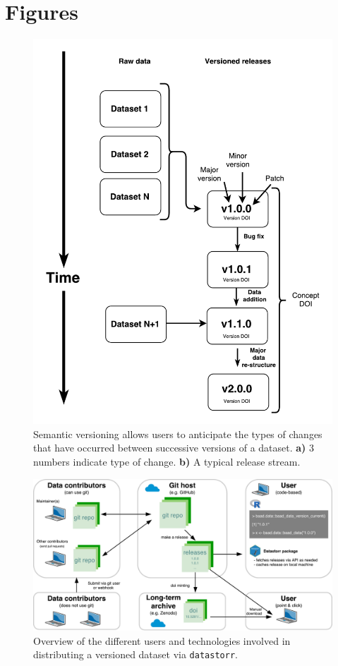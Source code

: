 \documentclass[english]{article}
\begin{document}
\newpage

\section*{Figures}

\begin{figure}[!hb]
\centering
\includegraphics[width=\linewidth]{figures/Figure1.pdf}
\caption{
Semantic versioning allows users to anticipate the types of changes that have occurred between successive versions of a dataset.
\textbf{a)} 3 numbers indicate type of change.
\textbf{b)} A typical release stream.}
\label{fig:semantic}
\end{figure}

\newpage


\begin{figure}[!hb]
\centering
\includegraphics[width=\linewidth]{figures/Figure2.pdf}
\caption{Overview of the different users and technologies involved in distributing a versioned dataset via \texttt{datastorr}.}
\label{fig:technology_stack}
\end{figure}

\clearpage


\end{document}
